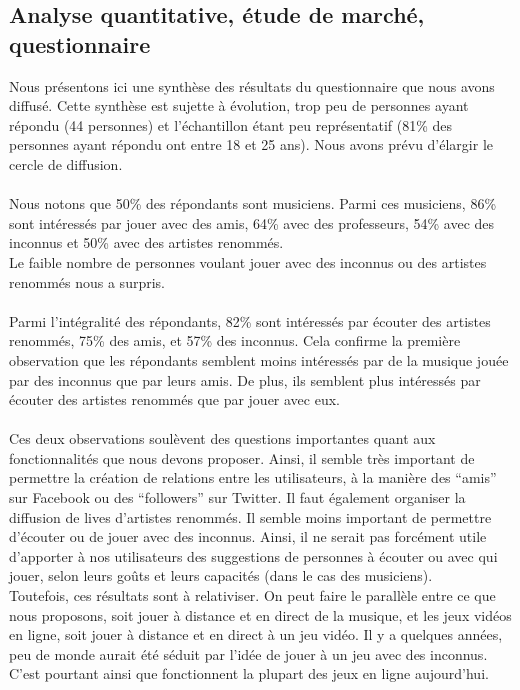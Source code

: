\documentclass[a4,12pt]{article}
\begin{document}
\subsection{Analyse quantitative, étude de marché, questionnaire}
Nous présentons ici une synthèse des résultats du questionnaire que nous avons diffusé. Cette synthèse est sujette à évolution, trop peu de personnes ayant répondu (44 personnes) et l’échantillon étant peu représentatif (81\% des personnes ayant répondu ont entre 18 et 25 ans). Nous avons prévu d’élargir le cercle de diffusion.\\
\\
Nous notons que 50\% des répondants sont musiciens. Parmi ces musiciens, 86\% sont intéressés par jouer avec des amis, 64\% avec des professeurs, 54\% avec des inconnus et 50\% avec des artistes renommés.\\
Le faible nombre de personnes voulant jouer avec des inconnus ou des artistes renommés nous a surpris.\\
\\
Parmi l’intégralité des répondants, 82\% sont intéressés par écouter des artistes renommés, 75\% des amis, et 57\% des inconnus. Cela confirme la première observation que les répondants semblent moins intéressés par de la musique jouée par des inconnus que par leurs amis. De plus, ils semblent plus intéressés par écouter des artistes renommés que par jouer avec eux.\\
\\
Ces deux observations soulèvent des questions importantes quant aux fonctionnalités que nous devons proposer. Ainsi, il semble très important de permettre la création de relations entre les utilisateurs, à la manière des “amis” sur Facebook ou des “followers” sur Twitter. Il faut également organiser la diffusion de lives d’artistes renommés.
Il semble moins important de permettre d’écouter ou de jouer avec des inconnus. Ainsi, il ne serait pas forcément utile d’apporter à nos utilisateurs des suggestions de personnes à écouter ou avec qui jouer, selon leurs goûts et leurs capacités (dans le cas des musiciens).\\
Toutefois, ces résultats sont à relativiser. On peut faire le parallèle entre ce que nous proposons, soit jouer à distance et en direct de la musique, et les jeux vidéos en ligne, soit jouer à distance et en direct à un jeu vidéo. Il y a quelques années, peu de monde aurait été séduit par l’idée de jouer à un jeu avec des inconnus. C’est pourtant ainsi que fonctionnent la plupart des jeux en ligne aujourd’hui.\\
\end{document}
